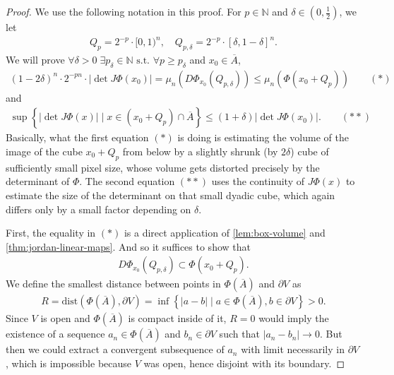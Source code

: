 \begin{proof}
	We use the following notation in this proof. For $p \in \mathbb{N}$ and $\delta \in (0, \tfrac{1}{2})$, we let
	\begin{align*}
		Q_{p} = 2^{-p} \cdot [0,1)^{n}, \quad Q_{p, \delta} = 2^{-p} \cdot [\delta, 1-\delta]^{n}.
	\end{align*}
	We will prove $\forall \delta > 0 \; \exists p_{\delta} \in \mathbb{N} \text{ s.t. } \forall p \geq p_{\delta}$ and $x_{0} \in \overline{ A }$,
	\begin{align*}
		(1-2\delta)^{n} \cdot 2^{-pn} \cdot \left| \det J \Phi(x_{0}) \right| = \mu_{n}( D\Phi_{x_{0}}(Q_{p, \delta})) \leq \mu_{n}(\Phi(x_{0} + Q_{p})) \quad \quad (*)
	\end{align*}
	and
	\begin{align*}
		\sup \left\{ \left| \det J \Phi(x) \right| \mid x \in (x_{0} + Q_{p}) \cap \overline{ A }  \right\} \leq (1+\delta) \left| \det J \Phi(x_{0}) \right|. \quad \quad (**)
	\end{align*}
	Basically, what the first equation $(*)$ is doing is estimating the volume of the image of the cube $x_{0} + Q_{p}$ from below by a slightly shrunk (by $2\delta$) cube of sufficiently small pixel size, whose volume gets distorted precisely by the determinant of $\Phi$. The second equation $(**)$ uses the continuity of $J \Phi(x)$ to estimate the size of the determinant on that small dyadic cube, which again differs only by a small factor depending on $\delta$.

	First, the equality in $(*)$ is a direct application of \ref{lem:box-volume} and \ref{thm:jordan-linear-maps}. And so it suffices to show that
	\begin{align*}
		D \Phi_{x_{0}}(Q_{p,\delta}) \subset \Phi(x_{0} + Q_{p}).
	\end{align*}
	We define the smallest distance between points in $\Phi(\overline{ A } )$ and $\partial V$ as
	\begin{align*}
		R = \text{dist}(\Phi(\overline{ A } ), \partial V) = \inf \left\{ \left| a-b \right| \mid a \in \Phi(\overline{ A } ), b \in \partial V \right\} > 0.
	\end{align*}
	Since $V$ is open and $\Phi(\overline{ A } )$ is compact inside of it, $R = 0$ would imply the existence of a sequence $a_{n} \in \Phi(\overline{ A } )$ and $b_{n} \in \partial V$ such that $\left| a_{n} - b_{n} \right| \to 0$. But then we could extract a convergent subsequence of $a_{n}$ with limit necessarily in $\partial V$, which is impossible because $V$ was open, hence disjoint with its boundary.


\end{proof}
